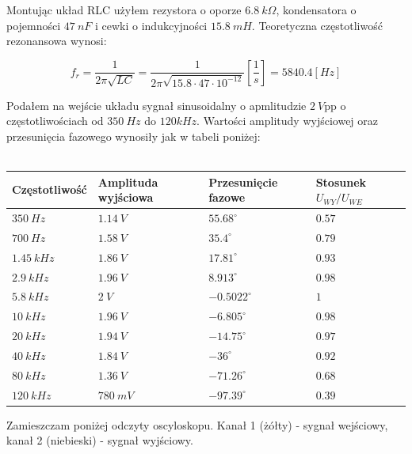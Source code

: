 \documentclass[14pt, table]{extarticle}
\begin{document}
Montując układ RLC użyłem rezystora o oporze $6.8 \ k \Omega$, kondensatora o pojemności $47 \ nF$ i cewki o indukcyjności $15.8 \ mH$. Teoretyczna częstotliwość rezonansowa wynosi:

$$ f_r = \frac{1}{2 \pi \sqrt{LC}} = \frac{1}{2 \pi \sqrt{15.8 \cdot 47 \cdot 10^{-12}}} \left[ \frac{1}{s} \right] = 5840.4 \left[ Hz \right] $$

Podałem na wejście układu sygnał sinusoidalny o apmlitudzie $2 \ V$pp o częstotliwościach od $350 \ Hz$ do $120 kHz$. Wartości amplitudy wyjściowej oraz przesunięcia fazowego wynosiły jak w tabeli poniżej: \\
\\

\begin{tabular}{ | m{4cm} | m{4cm}| m{4cm} | m{3.5cm} | } 
  \hline
  \textbf{Częstotliwość} & \textbf{Amplituda wyjściowa} & \textbf{Przesunięcie fazowe} & \textbf{Stosunek } $U_{WY} / U_{WE}$ \\ 
  \hline
  $350 \ Hz$ & $1.14 \ V$ & $55.68^{\circ}$ & $0.57$ \\
  \hline
  $700 \ Hz$ & $1.58 \ V$ & $35.4^{\circ}$ & $0.79$ \\
  \hline
  $1.45 \ kHz$ & $1.86 \ V$ & $17.81^{\circ}$ & $0.93$ \\
  \hline
  $2.9 \ kHz$ & $1.96 \ V$ & $8.913^{\circ}$ & $0.98$ \\
  \hline
  $5.8 \ kHz$ & $2 \ V$ & $-0.5022^{\circ}$ & $1$ \\
  \hline
  $10 \ kHz$ & $1.96 \ V$ & $-6.805^{\circ}$ & $0.98$ \\
  \hline
  $20 \ kHz$ & $1.94 \ V$ & $-14.75^{\circ}$ & $0.97$ \\
  \hline
  $40 \ kHz$ & $1.84 \ V$ & $-36^{\circ}$ & $0.92$ \\
  \hline
  $80 \ kHz$ & $1.36 \ V$ & $-71.26^{\circ}$ &  $0.68$ \\
  \hline
  $120 \ kHz$ & $780 \ mV$ & $-97.39^{\circ}$ &  $0.39$ \\
  \hline
\end{tabular}

\newpage
Zamieszczam poniżej odczyty oscyloskopu. Kanał 1 (żółty) - sygnał wejściowy, kanał 2 (niebieski) - sygnał wyjściowy.
\end{document}

